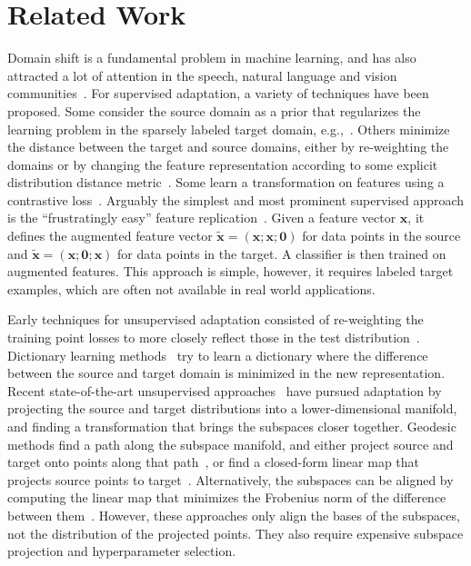 \documentclass[letterpaper]{article}
\begin{document}
\section{Related Work}
\label{sec:related}

Domain shift is a fundamental problem in machine learning, and has also attracted a lot of attention in the speech, natural language and vision communities~\cite{Blitzer07Biographies,gopalan-iccv11,bmvc}.
For supervised adaptation, a variety of techniques have been proposed. Some consider the source domain as a prior that regularizes the learning problem in the sparsely labeled target domain, e.g.,~\cite{yang_icdm07}. Others minimize the distance between the target and source domains, either by re-weighting the domains or by changing the feature representation according to some explicit distribution distance metric~\cite{mmd}. Some learn a transformation on features using a contrastive loss~\cite{saenko2010adapting}. 
Arguably the simplest and most prominent supervised approach is the ``frustratingly easy'' feature replication~\cite{daume}. 
Given a feature vector $\bm{x}$, it defines the augmented feature vector $\tilde{\bm{x}} = (\bm{x}; \bm{x}; \bm{0})$ for data points in the source and $\tilde{\bm{x}} = (\bm{x}; \bm{0}; \bm{x})$ for data points in the target. A classifier is then trained on augmented features. This approach is simple, however, it requires labeled target examples, which are often not available in real world applications.

Early techniques for unsupervised adaptation consisted of re-weighting the training point losses to more closely reflect those in the test distribution~\cite{jiang-zhai07,huang_nips06}. Dictionary learning methods~\cite{dict_1,dict_2} try to learn a dictionary where the difference between the source and target domain is minimized in the new representation.
Recent state-of-the-art unsupervised approaches~\cite{gopalan-iccv11,gfk,long_cvpr,Sp_CVPR15} have pursued adaptation by projecting the source and target distributions into a lower-dimensional manifold, and finding a transformation that brings the subspaces closer together. Geodesic methods find a path along the subspace manifold, and either project source and target onto points along that path~\cite{gopalan-iccv11}, or find a closed-form linear map that projects source points to target~\cite{gfk}. Alternatively, the subspaces can be aligned by computing the linear map that minimizes the Frobenius norm of the difference between them~\cite{outlooks,sasb}. However, these approaches only align the bases of the subspaces, not the distribution of the projected points. They also require expensive subspace projection and hyperparameter selection. 
\end{document}
